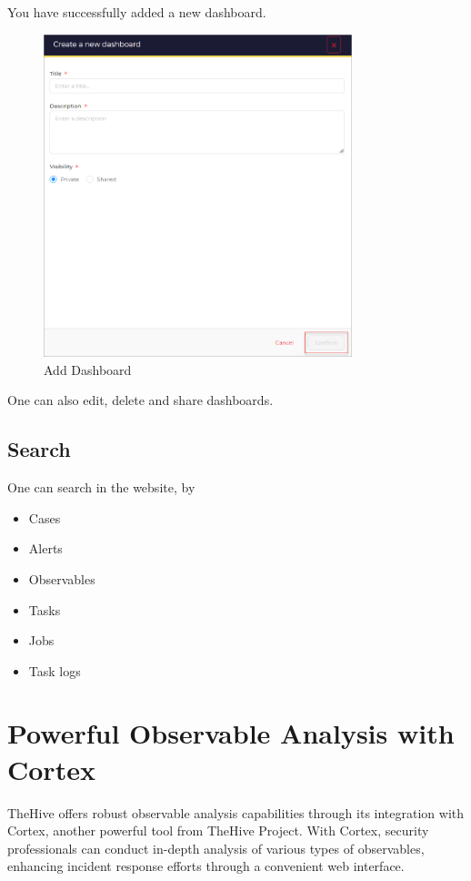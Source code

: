 \documentclass{article}
\begin{document}
You have successfully added a new dashboard.

\begin{figure}[H]
    \centering
    \includegraphics[width=0.8\textwidth]{dashboard3.png}
    \caption{Add Dashboard}
    \label{fig:adddashboard1}
\end{figure}

One can also edit, delete and share dashboards.\\

\subsection{Search}
One can search in the website, by
\begin{itemize}
    \item Cases
    \item Alerts
    \item Observables
    \item Tasks
    \item Jobs
    \item Task logs
\end{itemize}


\section{Powerful Observable Analysis with Cortex}
TheHive offers robust observable analysis capabilities through its integration with Cortex, another powerful tool from TheHive Project. With Cortex, security professionals can conduct in-depth analysis of various types of observables, enhancing incident response efforts through a convenient web interface.
\end{document}
